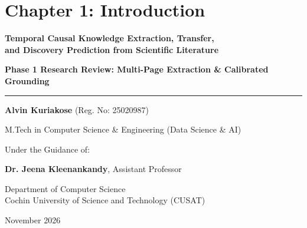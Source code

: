 \documentclass[aspectratio=43,10pt]{beamer}
\begin{document}
\section{Chapter 1: Introduction}

\begin{frame}[plain]
  \vspace{0.35cm}
  \begin{center}
    {\large\bfseries\color{navy} Temporal Causal Knowledge Extraction, Transfer,\\and Discovery Prediction from Scientific Literature}\par
    \vspace{0.15cm}
    {\footnotesize\bfseries\color{teal} Phase 1 Research Review: Multi-Page Extraction \& Calibrated Grounding}\par
    \vspace{0.25cm}
    {\color{navy}\rule{0.85\linewidth}{1.2pt}}\par
    \vspace{0.25cm}
    {\small\textbf{Alvin Kuriakose} \quad (Reg. No: 25020987)}\par
    {\footnotesize M.Tech in Computer Science \& Engineering (Data Science \& AI)}\par
    \vspace{0.25cm}
    {\footnotesize Under the Guidance of:}\par
    {\small\textbf{Dr. Jeena Kleenankandy}, Assistant Professor}\par
    \vspace{0.15cm}
    {\footnotesize Department of Computer Science\\Cochin University of Science and Technology (CUSAT)}\par
    \vspace{0.25cm}
    {\scriptsize\color{mutedtext} November 2026}
  \end{center}
\end{frame}
\end{document}
